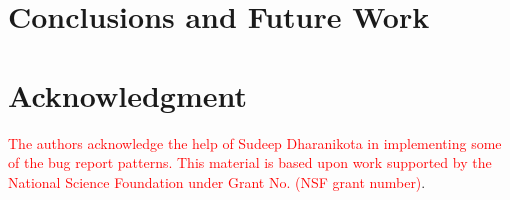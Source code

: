 \documentclass[10pt,conference]{IEEEtran}
\begin{document}


\section{Conclusions and Future Work}



\section*{Acknowledgment}
\textcolor{red}{The authors acknowledge the help of Sudeep Dharanikota in implementing some of the bug report patterns. This material is based upon work supported by the National Science Foundation under Grant No. (NSF grant number)}.



\end{document}
